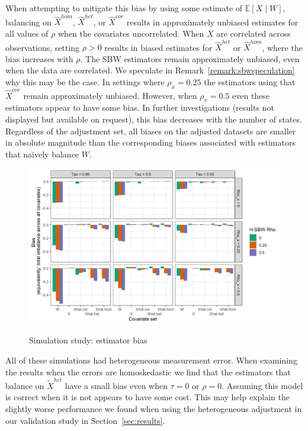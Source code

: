 When attempting to mitigate this bias by using some estimate of $\mathbb{E}[X \mid W]$, balancing on $\hat{X}^{hom}$, $\hat{X}^{het}$, or $\hat{X}^{cor}$ results in approximately unbiased estimates for all values of $\rho$ when the covariates uncorrelated. When $X$ are correlated across observations, setting $\rho > 0$ results in biased estimates for $\hat{X}^{het}$ or $\hat{X}^{hom}$, where the bias increases with $\rho$. The SBW estimators remain approximately unbiased, even when the data are correlated. We speculate in Remark~\ref{remark:sbwspeculation} why this may be the case. In settings where $\rho_x = 0.25$ the estimators using that $\hat{X}^{cor}$ remain approximately unbiased. However, when $\rho_x = 0.5$ even these estimators appear to have some bias. In further investigations (results not displayed but available on request), this bias decreases with the number of states. Regardless of the adjustment set, all biases on the adjusted datasets are smaller in absolute magnitude than the corresponding biases associated with estimators that naively balance $W$. 

\begin{figure}[H]
\begin{center}
    \caption{Simulation study: estimator bias}\label{fig:simbias}
    \label{fig:loveplotc1}
    \includegraphics[scale=0.5]{01_Plots/bias-plot.png}
\end{center}
\end{figure}

All of these simulations had heterogeneous measurement error. When examining the results when the errors are homoskedastic we find that the estimators that balance on $\tilde{X}^{het}$ have a small bias even when $\tau = 0$ or $\rho = 0$. Assuming this model is correct when it is not appears to have some cost. This may help explain the slightly worse performance we found when using the heterogeneous adjustment in our validation study in Section~\ref{sec:results}.

